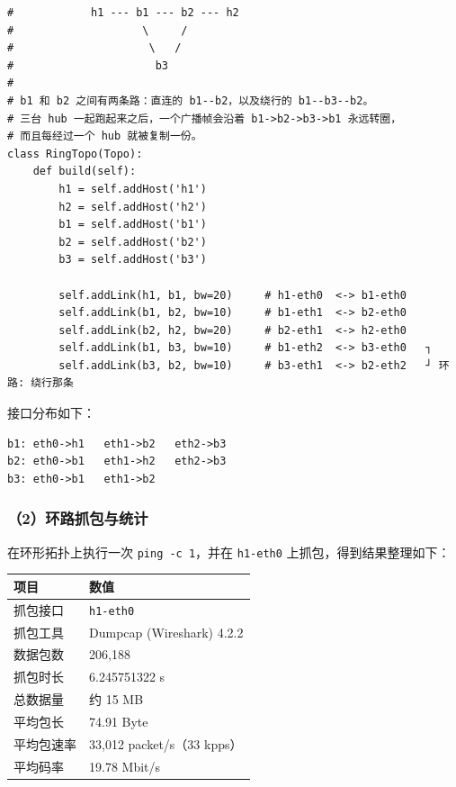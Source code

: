 \documentclass[UTF8,12pt,a4paper,fontset=fandol]{ctexart}
\begin{document}
\begin{verbatim}
#            h1 --- b1 --- b2 --- h2
#                    \     /
#                     \   /
#                      b3
#
# b1 和 b2 之间有两条路：直连的 b1--b2，以及绕行的 b1--b3--b2。
# 三台 hub 一起跑起来之后，一个广播帧会沿着 b1->b2->b3->b1 永远转圈，
# 而且每经过一个 hub 就被复制一份。
class RingTopo(Topo):
    def build(self):
        h1 = self.addHost('h1')
        h2 = self.addHost('h2')
        b1 = self.addHost('b1')
        b2 = self.addHost('b2')
        b3 = self.addHost('b3')

        self.addLink(h1, b1, bw=20)     # h1-eth0  <-> b1-eth0
        self.addLink(b1, b2, bw=10)     # b1-eth1  <-> b2-eth0
        self.addLink(b2, h2, bw=20)     # b2-eth1  <-> h2-eth0
        self.addLink(b1, b3, bw=10)     # b1-eth2  <-> b3-eth0   ┐
        self.addLink(b3, b2, bw=10)     # b3-eth1  <-> b2-eth2   ┘ 环路: 绕行那条
\end{verbatim}

接口分布如下：

\begin{verbatim}
b1: eth0->h1   eth1->b2   eth2->b3
b2: eth0->b1   eth1->h2   eth2->b3
b3: eth0->b1   eth1->b2
\end{verbatim}

\subsubsection*{（2）环路抓包与统计}

在环形拓扑上执行一次 \texttt{ping -c 1}，并在 \texttt{h1-eth0} 上抓包，得到结果整理如下：

\begin{center}
{\small
\begin{tabular}{@{}ll@{}}
\toprule
\rowcolor{TableHeader}\textbf{项目} & \textbf{数值}\\
\midrule
抓包接口 & \texttt{h1-eth0}\\
抓包工具 & Dumpcap (Wireshark) 4.2.2\\
数据包数 & 206,188\\
抓包时长 & 6.245751322 s\\
总数据量 & 约 15 MB\\
平均包长 & 74.91 Byte\\
平均包速率 & 33,012 packet/s（33 kpps）\\
平均码率 & 19.78 Mbit/s\\
\bottomrule
\end{tabular}}
\end{center}
\end{document}
